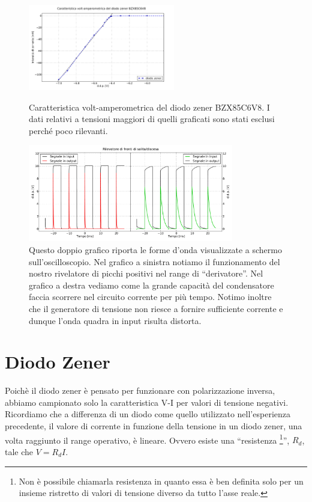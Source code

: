\begin{figure}
\centering
	\caption{Caratteristica volt-amperometrica del diodo zener BZX85C6V8. I dati relativi a tensioni maggiori di quelli graficati sono stati esclusi perché poco rilevanti.}
	\includegraphics[width=0.57\textwidth]{VI_zener.pdf}
	\label{fig:VI_zener}
\end{figure}

\begin{figure}[H]
\center
	\includegraphics[width=0.80\textwidth]{peaks(2).pdf}
	\caption{Questo doppio grafico riporta le forme d'onda visualizzate a schermo sull'oscilloscopio. Nel grafico a sinistra notiamo il funzionamento del nostro rivelatore di picchi positivi nel range di ``derivatore''. Nel grafico a destra vediamo come la grande capacità del condensatore faccia scorrere nel circuito corrente per più tempo. Notimo inoltre che il generatore di tensione non riesce a fornire sufficiente corrente e dunque l'onda quadra in input risulta distorta.}
	\label{fig:peaks}
\end{figure}

\section{Diodo Zener}

Poichè il diodo zener è pensato per funzionare con polarizzazione inversa, abbiamo campionato solo la caratteristica V-I per valori di tensione negativi.
Ricordiamo che a differenza di un diodo come quello utilizzato nell'esperienza precedente, il valore di corrente in funzione della tensione in un diodo zener, una volta raggiunto il range operativo, è lineare.
Ovvero esiste una ``resistenza \footnote{Non è possibile chiamarla resistenza in quanto essa è ben definita solo per un insieme ristretto di valori di tensione diverso da tutto l'asse reale.}'', $R_d$, tale che $V=R_d I$.

